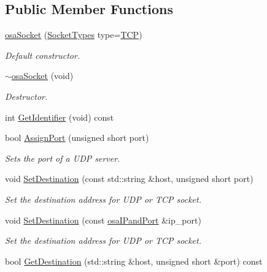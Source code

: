 \subsection*{Public Member Functions}
\begin{DoxyCompactItemize}
\item 
\hyperlink{classosa_socket_a978ed4ba465032ca6061fa6486464840}{osa\-Socket} (\hyperlink{classosa_socket_adeb99e6a5b2d4e503e0308ccb9677a00}{Socket\-Types} type=\hyperlink{classosa_socket_adeb99e6a5b2d4e503e0308ccb9677a00a285ce3d0ac4094f708fa3f7b2f222430}{T\-C\-P})
\begin{DoxyCompactList}\small\item\em Default constructor. \end{DoxyCompactList}\item 
\hyperlink{classosa_socket_a78099904ded5203835307eac712c4a14}{$\sim$osa\-Socket} (void)
\begin{DoxyCompactList}\small\item\em Destructor. \end{DoxyCompactList}\item 
int \hyperlink{classosa_socket_a109a21812219017a15fea0e38aa0c3c6}{Get\-Identifier} (void) const 
\item 
bool \hyperlink{classosa_socket_ac057f23deeeb355089a5f0b36b82c1eb}{Assign\-Port} (unsigned short port)
\begin{DoxyCompactList}\small\item\em Sets the port of a U\-D\-P server. \end{DoxyCompactList}\item 
void \hyperlink{classosa_socket_a5a02b283355bf2beff6217bb2e01c03a}{Set\-Destination} (const std\-::string \&host, unsigned short port)
\begin{DoxyCompactList}\small\item\em Set the destination address for U\-D\-P or T\-C\-P socket. \end{DoxyCompactList}\item 
void \hyperlink{classosa_socket_ac86d6d1c9c1155aa3f6fb5fd396fb2c9}{Set\-Destination} (const \hyperlink{structosa_i_pand_port}{osa\-I\-Pand\-Port} \&ip\-\_\-port)
\begin{DoxyCompactList}\small\item\em Set the destination address for U\-D\-P or T\-C\-P socket. \end{DoxyCompactList}\item 
bool \hyperlink{classosa_socket_a1f354c34c89fbbd12f3dee0be6787596}{Get\-Destination} (std\-::string \&host, unsigned short \&port) const 

\end{DoxyCompactItemize}
